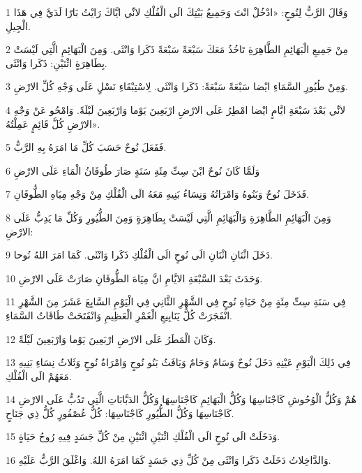 \par 1 وَقَالَ الرَّبُّ لِنُوحٍ: «ادْخُلْ انْتَ وَجَمِيعُ بَيْتِكَ الَى الْفُلْكِ لانِّي ايَّاكَ رَايْتُ بَارّا لَدَيَّ فِي هَذَا الْجِيلِ.
\par 2 مِنْ جَمِيعِ الْبَهَائِمِ الطَّاهِرَةِ تَاخُذُ مَعَكَ سَبْعَةً سَبْعَةً ذَكَرا وَانْثَى. وَمِنَ الْبَهَائِمِ الَّتِي لَيْسَتْ بِطَاهِرَةٍ اثْنَيْنِ: ذَكَرا وَانْثَى.
\par 3 وَمِنْ طُيُورِ السَّمَاءِ ايْضا سَبْعَةً سَبْعَةً: ذَكَرا وَانْثَى. لِاسْتِبْقَاءِ نَسْلٍ عَلَى وَجْهِ كُلِّ الارْضِ.
\par 4 لانِّي بَعْدَ سَبْعَةِ ايَّامٍ ايْضا امْطِرُ عَلَى الارْضِ ارْبَعِينَ يَوْما وَارْبَعِينَ لَيْلَةً. وَامْحُو عَنْ وَجْهِ الارْضِ كُلَّ قَائِمٍ عَمِلْتُهُ».
\par 5 فَفَعَلَ نُوحٌ حَسَبَ كُلِّ مَا امَرَهُ بِهِ الرَّبُّ.
\par 6 وَلَمَّا كَانَ نُوحٌ ابْنَ سِتِّ مِئَةِ سَنَةٍ صَارَ طُوفَانُ الْمَاءِ عَلَى الارْضِ
\par 7 فَدَخَلَ نُوحٌ وَبَنُوهُ وَامْرَاتُهُ وَنِسَاءُ بَنِيهِ مَعَهُ الَى الْفُلْكِ مِنْ وَجْهِ مِيَاهِ الطُّوفَانِ.
\par 8 وَمِنَ الْبَهَائِمِ الطَّاهِرَةِ وَالْبَهَائِمِ الَّتِي لَيْسَتْ بِطَاهِرَةٍ وَمِنَ الطُّيُورِ وَكُلِّ مَا يَدِبُّ عَلَى الارْضِ:
\par 9 دَخَلَ اثْنَانِ اثْنَانِ الَى نُوحٍ الَى الْفُلْكِ ذَكَرا وَانْثَى. كَمَا امَرَ اللهُ نُوحا.
\par 10 وَحَدَثَ بَعْدَ السَّبْعَةِ الايَّامِ انَّ مِيَاهَ الطُّوفَانِ صَارَتْ عَلَى الارْضِ.
\par 11 فِي سَنَةِ سِتِّ مِئَةٍ مِنْ حَيَاةِ نُوحٍ فِي الشَّهْرِ الثَّانِي فِي الْيَوْمِ السَّابِعَ عَشَرَ مِنَ الشَّهْرِ انْفَجَرَتْ كُلُّ يَنَابِيعِ الْغَمْرِ الْعَظِيمِ وَانْفَتَحَتْ طَاقَاتُ السَّمَاءِ.
\par 12 وَكَانَ الْمَطَرُ عَلَى الارْضِ ارْبَعِينَ يَوْما وَارْبَعِينَ لَيْلَةً.
\par 13 فِي ذَلِكَ الْيَوْمِ عَيْنِهِ دَخَلَ نُوحٌ وَسَامٌ وَحَامٌ وَيَافَثُ بَنُو نُوحٍ وَامْرَاةُ نُوحٍ وَثَلاثُ نِسَاءِ بَنِيهِ مَعَهُمْ الَى الْفُلْكِ.
\par 14 هُمْ وَكُلُّ الْوُحُوشِ كَاجْنَاسِهَا وَكُلُّ الْبَهَائِمِ كَاجْنَاسِهَا وَكُلُّ الدَبَّابَاتِ الَّتِي تَدُبُّ عَلَى الارْضِ كَاجْنَاسِهَا وَكُلُّ الطُّيُورِ كَاجْنَاسِهَا: كُلُّ عُصْفُورٍ كُلُّ ذِي جَنَاحٍ.
\par 15 وَدَخَلَتْ الَى نُوحٍ الَى الْفُلْكِ اثْنَيْنِ اثْنَيْنِ مِنْ كُلِّ جَسَدٍ فِيهِ رُوحُ حَيَاةٍ.
\par 16 وَالدَّاخِلاتُ دَخَلَتْ ذَكَرا وَانْثَى مِنْ كُلِّ ذِي جَسَدٍ كَمَا امَرَهُ اللهُ. وَاغْلَقَ الرَّبُّ عَلَيْهِ.
